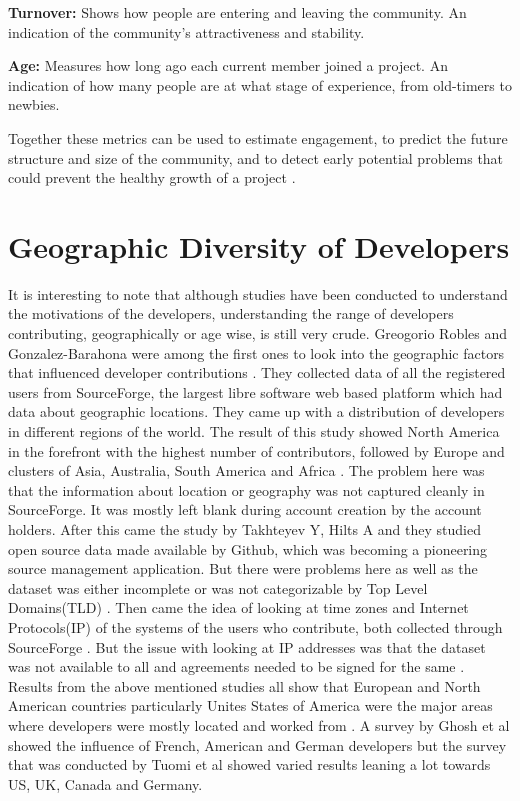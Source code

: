 \documentclass[double,12pt]{beavtex}
\begin{document}
\textbf{Turnover:}
Shows how people are entering and leaving the community. An indication of the community's attractiveness and stability.

\textbf{Age:}
Measures how long ago each current member joined a project. An indication of how many people are at what stage of experience, from old-timers to newbies.

Together these metrics can be used to estimate engagement, to predict the future structure and size of the community, and to detect early potential problems that could prevent the healthy growth of a project \cite{jes2014}.

\section{Geographic Diversity of Developers}
It is interesting to note that although studies have been conducted to understand the motivations of the developers, understanding the range of developers contributing, geographically or age wise, is still very crude. Greogorio Robles and Gonzalez-Barahona were among the first ones to look into the geographic factors that influenced developer contributions \cite{kishida2003}. They collected data of all the registered users from SourceForge, the largest libre software web based platform which had data about geographic locations. They came up with a distribution of developers in different regions of the world. The result of this study showed North America in the forefront with the highest number of contributors, followed by Europe and clusters of Asia, Australia, South America and Africa \cite{robles2006}. The problem here was that the information about location or geography was not captured cleanly in SourceForge. It was mostly left blank during account creation by the account holders.  
After this came the study by Takhteyev Y, Hilts A and they studied open source data made available by Github, which was becoming a pioneering source management application. But there were problems here as well as the dataset was either incomplete or was not categorizable by Top Level Domains(TLD) \cite{yuri2010}. Then came the idea of looking at time zones and Internet Protocols(IP) of the systems of the users who contribute, both collected through SourceForge \cite{von2010}. But the issue with looking at IP addresses was that the dataset was not available to all and agreements needed to be signed for the same \cite{von2010}. Results from the above mentioned studies all show that European and North American countries particularly Unites States of America were the major areas where developers were mostly located and worked from \cite{yuri2010, von2010}. A survey by Ghosh et al \cite{ghosh2005} showed the influence of French, American and German developers but the survey that was conducted by Tuomi et al \cite{tuomi2004} showed varied results leaning a lot towards US, UK, Canada and Germany.
\end{document}
